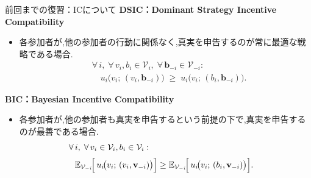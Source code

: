 \documentclass[dvipdfmx,autodetect-engine]{beamer}
\begin{document}
\begin{frame}{前回までの復習：ICについて}
\small
\textbf{DSIC：Dominant Strategy Incentive Compatibility}

\begin{itemize}
  \item 各参加者が,他の参加者の行動に関係なく,真実を申告するのが常に最適な戦略である場合.
\begin{align*}
  &\forall\,i,\;\forall\,v_i,b_i\in\mathcal{V}_i,\;
    \forall\,\mathbf{b}_{-i}\in\mathcal{V}_{-i}:\\[2pt]
  &\quad
    u_i\!\bigl(v_i;\,(v_i,\mathbf{b}_{-i})\bigr)
    \;\ge\;
    u_i\!\bigl(v_i;\,(b_i,\mathbf{b}_{-i})\bigr).
\end{align*}
\end{itemize}

\vspace{1em}

\textbf{BIC：Bayesian Incentive Compatibility}

\begin{itemize}
  \item 各参加者が,他の参加者も真実を申告するという前提の下で,真実を申告するのが最善である場合.
\begin{align*}
  \forall\,i,\;\forall\,v_i\in\mathcal{V}_i,b_i\in\mathcal{V}_i:\quad\\[2pt]
  \mathbb{E}_{\mathcal{V}_{-i}}\!\Bigl[\,u_i\!\bigl(v_i;\,(v_i,\mathbf{v}_{-i})\bigr)\Bigr]
  &\ge
  \mathbb{E}_{\mathcal{V}_{-i}}\!\Bigl[\,u_i\!\bigl(v_i;\,(b_i,\mathbf{v}_{-i})\bigr)\Bigr].
\end{align*}
\end{itemize}
\end{frame}
\end{document}
